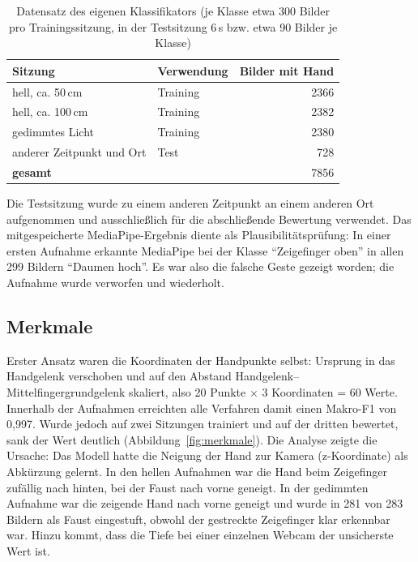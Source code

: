 \documentclass[11pt,a4paper]{article}
\begin{document}
\begin{table}[H]
\centering
\begin{tabular}{llr}
\toprule
Sitzung & Verwendung & Bilder mit Hand \\
\midrule
hell, ca. 50\,cm & Training & 2366 \\
hell, ca. 100\,cm & Training & 2382 \\
gedimmtes Licht & Training & 2380 \\
anderer Zeitpunkt und Ort & Test & 728 \\
\midrule
\textbf{gesamt} & & 7856 \\
\bottomrule
\end{tabular}
\caption{Datensatz des eigenen Klassifikators (je Klasse etwa 300 Bilder pro Trainingssitzung,
in der Testsitzung 6\,s bzw. etwa 90 Bilder je Klasse)}
\end{table}

Die Testsitzung wurde zu einem anderen Zeitpunkt an einem anderen Ort aufgenommen und
ausschließlich für die abschließende Bewertung verwendet. Das mitgespeicherte MediaPipe-Ergebnis
diente als Plausibilitätsprüfung: In einer ersten Aufnahme erkannte MediaPipe bei der Klasse
\enquote{Zeigefinger oben} in allen 299 Bildern \enquote{Daumen hoch}. Es war also die falsche
Geste gezeigt worden; die Aufnahme wurde verworfen und wiederholt.

\subsection{Merkmale}

Erster Ansatz waren die Koordinaten der Handpunkte selbst: Ursprung in das Handgelenk verschoben
und auf den Abstand Handgelenk--Mittelfingergrundgelenk skaliert, also 20 Punkte $\times$ 3
Koordinaten = 60 Werte. Innerhalb der Aufnahmen erreichten alle Verfahren damit einen Makro-F1 von
0,997. Wurde jedoch auf zwei Sitzungen trainiert und auf der dritten bewertet, sank der Wert
deutlich (Abbildung~\ref{fig:merkmale}). Die Analyse zeigte die Ursache: Das Modell hatte die
Neigung der Hand zur Kamera (z-Koordinate) als Abkürzung gelernt. In den hellen Aufnahmen war die
Hand beim Zeigefinger zufällig nach hinten, bei der Faust nach vorne geneigt. In der gedimmten
Aufnahme war die zeigende Hand nach vorne geneigt und wurde in 281 von 283 Bildern als Faust
eingestuft, obwohl der gestreckte Zeigefinger klar erkennbar war. Hinzu kommt, dass die Tiefe bei
einer einzelnen Webcam der unsicherste Wert ist.
\end{document}

